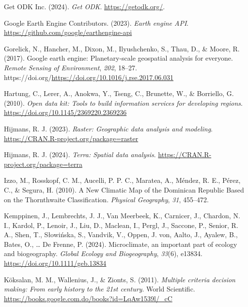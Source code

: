 \documentclass[spanish]{article}
\newlength{\cslhangindent}
\newlength{\cslentryspacingunit} %
\newenvironment{CSLReferences}[2] %
 {%
  \setlength{\parindent}{0pt}
  \ifodd #1
  \let\oldpar\par
  \def\par{\hangindent=\cslhangindent\oldpar}
  \fi
  \setlength{\parskip}{#2\cslentryspacingunit}
 }%
 {}
\begin{document}
\begin{CSLReferences}{1}{0}
\leavevmode{}%
Get ODK Inc. (2024). \emph{Get ODK}. \url{https://getodk.org/}.

\leavevmode{}%
Google Earth Engine Contributors. (2023). \emph{Earth engine API}.
\url{https://github.com/google/earthengine-api}

\leavevmode{}%
Gorelick, N., Hancher, M., Dixon, M., Ilyushchenko, S., Thau, D., \&
Moore, R. (2017). Google earth engine: Planetary-scale geospatial
analysis for everyone. \emph{Remote Sensing of Environment}, \emph{202},
18--27. https://doi.org/\url{https://doi.org/10.1016/j.rse.2017.06.031}

\leavevmode{}%
Hartung, C., Lerer, A., Anokwa, Y., Tseng, C., Brunette, W., \&
Borriello, G. (2010). \emph{Open data kit: Tools to build information
services for developing regions}.
\url{https://doi.org/10.1145/2369220.2369236}

\leavevmode{}%
Hijmans, R. J. (2023). \emph{Raster: Geographic data analysis and
modeling}. \url{https://CRAN.R-project.org/package=raster}

\leavevmode{}%
Hijmans, R. J. (2024). \emph{Terra: Spatial data analysis}.
\url{https://CRAN.R-project.org/package=terra}

\leavevmode{}%
Izzo, M., Rosskopf, C. M., Aucelli, P. P. C., Maratea, A., Méndez, R.
E., Pérez, C., \& Segura, H. (2010). {A New Climatic Map of the
Dominican Republic Based on the Thornthwaite Classification}.
\emph{Physical Geography}, \emph{31}, 455--472.

\leavevmode{}%
Kemppinen, J., Lembrechts, J. J., Van Meerbeek, K., Carnicer, J.,
Chardon, N. I., Kardol, P., Lenoir, J., Liu, D., Maclean, I., Pergl, J.,
Saccone, P., Senior, R. A., Shen, T., Słowińska, S., Vandvik, V., Oppen,
J. von, Aalto, J., Ayalew, B., Bates, O., \ldots{} De Frenne, P. (2024).
Microclimate, an important part of ecology and biogeography.
\emph{Global Ecology and Biogeography}, \emph{33}(6), e13834.
\url{https://doi.org/10.1111/geb.13834}

\leavevmode{}%
Köksalan, M. M., Wallenius, J., \& Zionts, S. (2011). \emph{Multiple
criteria decision making: From early history to the 21st century}. World
Scientific. \url{https://books.google.com.do/books?id=LqAw1539l/_cC}


\end{CSLReferences}
\end{document}

